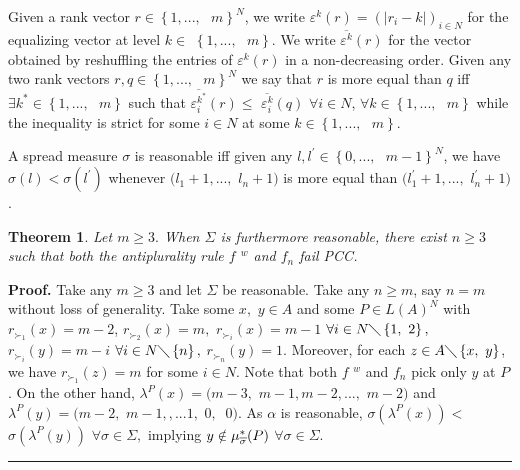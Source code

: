 \documentclass{article}
\newtheorem{theorem}{Theorem}
\newenvironment{proof}[1][Proof]{\noindent\textbf{#1.} }{\ \rule{0.5em}{0.5em}}
\begin{document}
Given a rank vector $r\in \left\{ 1,...,\text{ }m\right\} ^{N}$, we write $%
\varepsilon ^{k}(r)=(\left\vert r_{i}-k\right\vert )_{i\in N}$ for the
equalizing vector at level $k\in $ $\left\{ 1,...,\text{ }m\right\} $. We
write $\overline{\varepsilon ^{k}}(r)$ for the vector obtained by
reshuffling the entries of $\varepsilon ^{k}(r)$ in a non-decreasing order.
Given any two rank vectors $r,q\in \left\{ 1,...,\text{ }m\right\} ^{N}$ we
say that $r$ is more equal than $q$ iff $\exists k^{\ast }\in \left\{ 1,...,%
\text{ }m\right\} $ such that $\overline{\varepsilon _{i}^{k^{\ast }}}%
(r)\leq $ $\overline{\varepsilon _{i}^{k}}(q)$ $\forall i\in N$, $\forall
k\in \left\{ 1,...,\text{ }m\right\} $ while the inequality is strict for
some $i\in N$ at some $k\in \left\{ 1,...,\text{ }m\right\} $.

A spread measure $\sigma $ is reasonable iff given any $l,l^{\prime }\in
\left\{ 0,...,\text{ }m-1\right\} ^{N}$, we have $\sigma (l)<\sigma
(l^{\prime })$ whenever $(l_{1}+1,...,$ $l_{n}+1)$ is more equal than $%
(l_{1}^{\prime }+1,...,$ $l_{n}^{\prime }+1)$.

\begin{theorem}
Let $m\geq 3.$ When $\Sigma $ is furthermore reasonable, there exist $n\geq
3 $ such that both the antiplurality rule $f$ $^{w}$ and $f_{n}$ fail PCC.
\end{theorem}

\begin{proof}
Take any $m\geq 3$ and let $\Sigma $ be reasonable. Take any $n\geq m$, say $%
n=m$ without loss of generality. Take some $x,$ $y\in A$ and some $P\in
L(A)^{N}$ with $r_{\succ _{1}}(x)=m-2$, $r_{\succ _{2}}(x)=m,$ $r_{\succ
_{i}}(x)=m-1$ $\forall i\in N\diagdown \left\{ 1,\text{ }2\right\} ,$ $%
r_{\succ _{i}}(y)=m-i$ $\forall i\in N\diagdown \left\{ n\right\} ,$ $%
r_{\succ _{n}}(y)=1$. Moreover, for each $z\in A\diagdown \left\{ x,\text{ }%
y\right\} $, we have $r_{\succ _{1}}(z)=m$ for some $i\in N$. Note that both 
$f$ $^{w}$ and $f_{n}$ pick only $y$ at $P$. On the other hand, $\lambda
^{P}(x)=(m-3,$ $m-1,m-2,...,$ $m-2)$ and $\lambda ^{P}(y)=(m-2,$ $m-1,,...1,$
$0,$ $\ 0)$. As $\alpha $ is reasonable, $\sigma (\lambda ^{P}(x))<$ $\sigma
(\lambda ^{P}(y))$ $\forall \sigma \in \Sigma ,$ implying $y\notin \mu _{%
\overline{\sigma }}^{\ast }(P)$ $\forall \sigma \in \Sigma .$
\end{proof}
\end{document}
